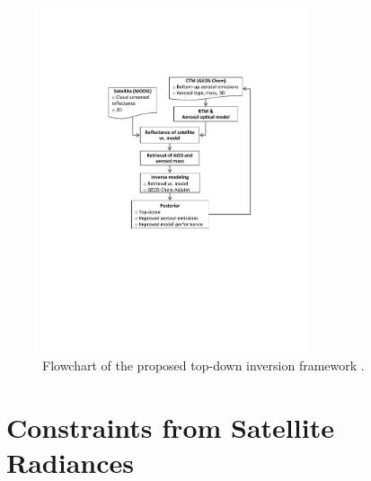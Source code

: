  \begin{figure}[t]
  \centering
  \includegraphics[width={0.7\textwidth}]{figures/a1.pdf}
  \caption{Flowchart of the proposed top-down inversion framework \citep{xu13}.}
  \label{fig:flowchat}
 \end{figure}

\section{Constraints from Satellite Radiances} \label{sec:modisobs}

